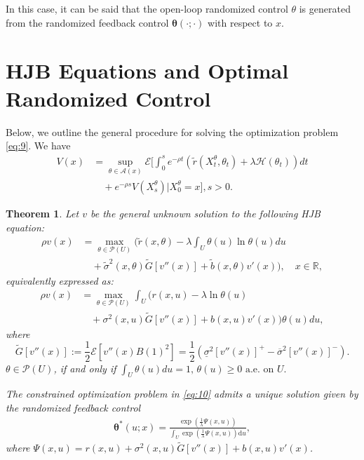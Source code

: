 \documentclass[onecolumn, journal]{IEEEtran} %
\newtheorem{theorem}{Theorem}
\begin{document}
	In this case, it can be said that the open-loop randomized control \( \theta \) is generated from the randomized feedback control \(\boldsymbol{\theta}(\cdot;\cdot)\) with respect to \( x \).
	\section{HJB Equations and Optimal Randomized Control}
	
	Below, we outline the general procedure for solving the optimization problem \eqref{eq:9}. We have
	\[
	\begin{split}
		V(x) &=\sup_{\theta \in \mathcal{A}(x)} \mathcal{E} \bigg[ \int_0^s e^{-\rho t} \left( \tilde{r} \left( X_t^\theta, \theta_t \right) + \lambda \mathcal{H} \left( \theta_t \right) \right) dt \\
		&\quad + e^{-\rho s} V \left( X_s^\theta \right) \bigg| X_0^\theta = x \bigg], s > 0.
	\end{split}
	\]
	\begin{theorem}
		Let $v$ be the general unknown solution to the following HJB equation:
		\begin{align*}
			\rho v(x) &= \max_{\theta \in\mathcal{P}(U)} \bigg( \tilde{r}(x, \theta) - \lambda \int_U \theta(u) \ln \theta(u) du \\
			&\quad +\tilde{\sigma}^2 (x, \theta) \widetilde{G}[v''(x)] + \tilde{b}(x, \theta) v'(x) \bigg), \quad x \in \mathbb{R},
		\end{align*}
		equivalently expressed as:
		\begin{equation}\label{eq:10}
			\begin{split}
				\rho v(x) &= \max_{\theta \in\mathcal{P}(U)} \int_U \bigg( r(x, u) - \lambda \ln \theta(u) \\
				&\quad +\sigma^2 (x, u) \widetilde{G}[v''(x)] + b(x, u) v'(x) \bigg) \theta(u) du,
			\end{split}
			\tag{10}
		\end{equation}
		where
		\[
		\widetilde{G}[v''(x)] := \frac{1}{2} \mathcal{E}[v''(x) B(1)^2] = \frac{1}{2} (\underline{\sigma}^2 [v''(x)]^+ - \overline{\sigma}^2 [v''(x)]^-).
		\]
		$ \theta \in \mathcal{P}(U) $, if and only if $
		\int_U \theta(u) du = 1, \, \theta(u) \geq 0 \text{ a.e. on } U.$
		
		The constrained optimization problem in \eqref{eq:10} admits a unique solution given by the randomized feedback control
		\begin{equation}\label{eq:11}
			\begin{aligned}
				\boldsymbol{\theta}^*(u;x) = \frac{ \exp\left( \frac{1}{\lambda} \Psi(x,u) \right) }{ \int_{U} \exp\left( \frac{1}{\lambda} \Psi(x,u) \right) \mathrm{d}u },
			\end{aligned}
			\tag{11}
		\end{equation}
		where $\Psi(x,u) = r(x,u) + \sigma^2(x,u) \widetilde{G}[v''(x)] + b(x,u)v'(x)$.
	\end{theorem}
\end{document}
